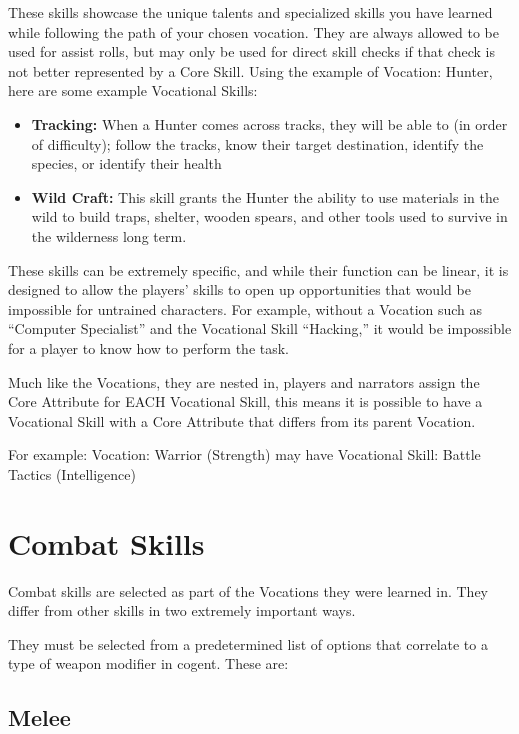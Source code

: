 These skills showcase the unique talents and specialized skills you have learned while following the path of your chosen vocation. They are always allowed to be used for assist rolls, but may only be used for direct skill checks if that check is not better represented by a Core Skill. Using the example of Vocation: Hunter, here are some example Vocational Skills:

\begin{itemize}
    \item \textbf{Tracking:} When a Hunter comes across tracks, they will be able to (in order of difficulty); follow the tracks, know their target destination, identify the species, or identify their health
    \item \textbf{Wild Craft:} This skill grants the Hunter the ability to use materials in the wild to build traps, shelter, wooden spears, and other tools used to survive in the wilderness long term.
\end{itemize}

These skills can be extremely specific, and while their function can be linear, it is designed to allow the players' skills to open up opportunities that would be impossible for untrained characters. For example, without a Vocation such as “Computer Specialist” and the Vocational Skill “Hacking,” it would be impossible for a player to know how to perform the task.

Much like the Vocations, they are nested in, players and narrators assign the Core Attribute for EACH Vocational Skill, this means it is possible to have a Vocational Skill with a Core Attribute that differs from its parent Vocation.

For example: Vocation: Warrior (Strength) may have Vocational Skill: Battle Tactics (Intelligence)

\section{Combat Skills} \label{sec:combat_skills}

Combat skills are selected as part of the Vocations they were learned in. They differ from other skills in two extremely important ways.

They must be selected from a predetermined list of options that correlate to a type of weapon modifier in cogent. These are:

\subsection{Melee} \label{subsec:melee}

